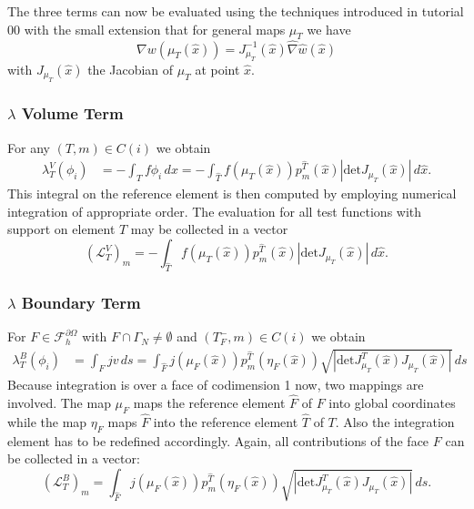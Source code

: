 \documentclass[a4paper,12pt]{article}
\begin{document}
The three terms can now be evaluated using the techniques introduced in 
tutorial 00 with the small extension that for general maps $\mu_T$ we
have 
$$\nabla w(\mu_T(\hat x)) = J_{\mu_T}^{-1}(\hat x) \hat\nabla \hat w (\hat x)$$
with $J_{\mu_T}(\hat x)$ the Jacobian of $\mu_T$ at point $\hat x$.

\subsubsection*{$\lambda$ Volume Term}

For any $(T,m)\in C(i)$ we obtain
\begin{equation*}
\begin{split}
\lambda_T^V(\phi_i) &= - \int_T f \phi_i \,dx = 
- \int_{\hat T} f(\mu_T(\hat x)) p_m^{\hat T}(\hat x) |\text{det} J_{\mu_T}(\hat x)|\, d\hat x .
\end{split}
\end{equation*}
This integral on the reference element is then computed by employing
numerical integration of appropriate order.
The evaluation for all test functions with support on element $T$ may be collected in
a vector 
\begin{equation*}
(\mathcal{L}_T^V)_m = - \int_{\hat T} f(\mu_T(\hat x)) p_m^{\hat T}(\hat x) 
|\text{det} J_{\mu_T}(\hat x)|\, d\hat x.
\end{equation*}

\subsubsection*{$\lambda$ Boundary Term}

For $F\in\mathcal{F}_h^{\partial\Omega}$ with $F\cap\Gamma_N\neq\emptyset$
and $(T_F^-,m)\in C(i)$ we obtain
\begin{equation*}
\begin{split}
\lambda_T^B(\phi_i) &= \int_{F} j v\,ds = 
\int_{\hat F} j(\mu_F(\hat x)) p_m^{\hat T}(\eta_F(\hat x)) 
\sqrt{|\text{det} J^T_{\mu_T}(\hat x)J_{\mu_T}(\hat x)|} \,ds
\end{split}
\end{equation*}
Because integration is over a face of codimension 1 now, two mappings are
involved. The map $\mu_F$ maps the reference element $\hat F$ of $F$ into
global coordinates while the map $\eta_F$ maps $\hat F$ into the reference
element $\hat T$ of $T$. Also the integration element has to be redefined accordingly.
Again, all contributions of the face $F$ can be collected in a vector:
\begin{equation*}
(\mathcal{L}_T^B)_m = 
\int_{\hat F} j(\mu_F(\hat x)) p_m^{\hat T}(\eta_F(\hat x)) 
\sqrt{|\text{det} J^T_{\mu_T}(\hat x)J_{\mu_T}(\hat x)|} \,ds .
\end{equation*}
\end{document}
